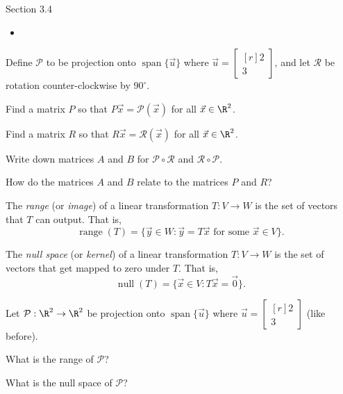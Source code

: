 \documentclass{problemset}
\DeclareMathOperator{\Span}{span}
\DeclareMathOperator{\Range}{range}
\DeclareMathOperator{\Null}{null}
\newcommand{\mat}[1]{\begin{bmatrix*}[r]#1\end{bmatrix*}}
\begin{document}
\newpage
\pagestyle{siefken}


\begin{lesson}
	\newpage

	Section 3.4

	\begin{itemize}
		\item 
	\end{itemize}


	\newpage
\end{lesson}
	\question
	Define $\mathcal P$ to be projection onto $\Span\{\vec u\}$ where $\vec u=\mat{2\\3}$,
	and let $\mathcal R$ be rotation counter-clockwise by $90^\circ$.
	\begin{parts}
		\item Find a matrix $P$ so that $P\vec x=\mathcal P(\vec x)$ for all $\vec x\in\R^2$.
		\item Find a matrix $R$ so that $R\vec x=\mathcal R(\vec x)$ for all $\vec x\in\R^2$.
		\item Write down matrices $A$ and $B$
			for $\mathcal P\circ\mathcal R$ and $\mathcal R\circ \mathcal P$.
		\item How do the matrices $A$ and $B$ relate to the matrices $P$ and $R$?
	\end{parts}

	\begin{definition}[Range]
		The \emph{range} (or \emph{image}) of a linear transformation $T:V\to W$ is the set of vectors that
		$T$ can output.  That is,
		\[
			\Range(T)=\{\vec y\in W:\vec y=T\vec x\text{ for some }\vec x\in V\}.
		\]
	\end{definition}
	\begin{definition}
		The \emph{null space} (or \emph{kernel}) of a linear transformation $T:V\to W$ is the
		set of vectors that get mapped to zero under $T$.  That is,
		\[
			\Null(T)=\{\vec x\in V:T\vec x=\vec 0\}.
		\]
	\end{definition}

	\question
	Let $\mathcal P:\R^2\to\R^2$ be projection onto $\Span\{\vec u\}$ where $\vec u=\mat{2\\3}$ (like before).
	\begin{parts}
		\item What is the range of $\mathcal P$?
		\item What is the null space of $\mathcal P$?
	\end{parts}
\end{document}
